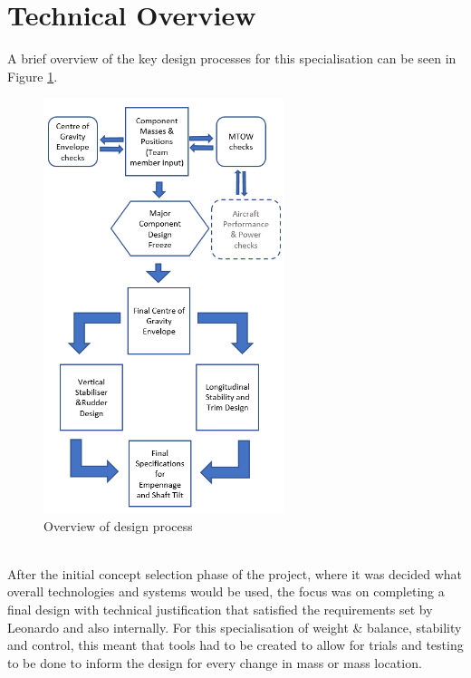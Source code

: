 \documentclass[11pt,a4paper]{article}
\begin{document}
\section{Technical Overview}
A brief overview of the key design processes for this specialisation can be seen in  Figure \ref{fig:flow}.
\begin{figure}
    \includegraphics[width=7cm]{Flowchart.PNG}
    \caption{Overview of design process}
    \label{fig:flow}
    \vspace{-510pt}
\end{figure}
\\
After the initial concept selection phase of the project, where it was decided what overall technologies and systems would be used, the focus was on completing a final design with technical justification that satisfied the requirements set by Leonardo and also internally. For this specialisation of weight \& balance, stability and control, this meant that tools had to be created to allow for trials and testing to be done to inform the design for every change in mass or mass location.
\end{document}

